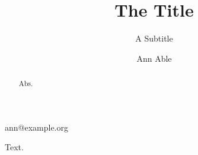 \documentclass[english]{lni}
\begin{document}
\title{The Title}
\subtitle{A Subtitle}
\author[1]{Ann Able}{ann@example.org}{}
\maketitle
\begin{abstract}
Abs.
\end{abstract}
Text.
\end{document}
